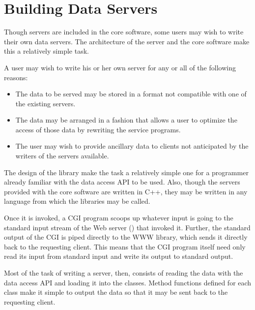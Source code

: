 \section{Building \opendap Data Servers}
\label{opd-server,building}

Though servers are included in the \opendap core software, some
users may wish to write their own \opendap data servers. The architecture
of the  server and the \opendap core software make this a
relatively simple task.  

A user may wish to write his or her own \opendap server for any or all of
the following reasons:

\begin{itemize}
  
\item The data to be served may be stored in a format not compatible
  with one of the existing \opendap servers.
  
\item The data may be arranged in a fashion that allows a user to
  optimize the access of those data by rewriting the service programs.
  
\item The user may wish to provide ancillary data to \opendap clients not
  anticipated by the writers of the servers available.

\end{itemize}

The design of the \opendap library make the task a relatively simple one
for a programmer already familiar with the data access API to be used.
Also, though the servers provided with the \opendap core software are
written in C++, they may be written in any language from which the
\opendap libraries may be called.

Once it is invoked, a CGI program scoops up whatever input is going to
the standard input stream of the Web server () that invoked it.
Further, the standard output of the CGI is piped directly to the WWW
library, which sends it directly back to the requesting client. This means
that the CGI program itself need only read its input from standard input
and write its output to standard output.

Most of the task of writing a server, then, consists of reading the data
with the data access API and loading it into the \opendap classes. Method
functions defined for each class make it simple to output the data so that
it may be sent back to the requesting client.

